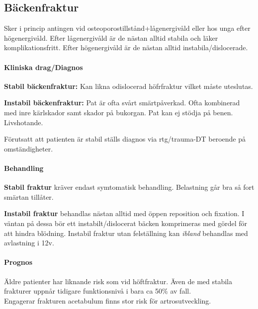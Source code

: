 \documentclass[
  letterpaper,
  DIV=11,
  numbers=noendperiod]{scrreport}
\let\oldparagraph\paragraph
\renewcommand{\paragraph}[1]{\oldparagraph{#1}\mbox{}}
\begin{document}
\hypertarget{buxe4ckenfraktur}{%
\subsection{Bäckenfraktur}\label{buxe4ckenfraktur}}

Sker i princip antingen vid osteoporostillstånd+lågenergivåld eller hos
unga efter högenergivåld. Efter lågenergivåld är de nästan alltid
stabila och läker komplikationsfritt. Efter högenergivåld är de nästan
alltid instabila/dislocerade.

\hypertarget{kliniska-dragdiagnos-9}{%
\paragraph{Kliniska drag/Diagnos}\label{kliniska-dragdiagnos-9}}

\textbf{Stabil bäckenfraktur:} Kan likna odislocerad höfrfraktur vilket
måste uteslutas.

\textbf{Instabil bäckenfraktur:} Pat är ofta svårt smärtpåverkad. Ofta
kombinerad med inre kärlskador samt skador på bukorgan. Pat kan ej
stödja på benen. Livshotande.

Förutsatt att patienten är stabil ställs diagnos via rtg/trauma-DT
beroende på omständigheter.

\hypertarget{behandling-10}{%
\paragraph{Behandling}\label{behandling-10}}

\textbf{Stabil fraktur} kräver endast symtomatisk behandling. Belastning
går bra så fort smärtan tillåter.

\textbf{Instabil fraktur} behandlas nästan alltid med öppen reposition
och fixation. I väntan på dessa bör ett instabilt/dislocerat bäcken
komprimeras med gördel för att hindra blödning. Instabil fraktur utan
felställning kan \emph{ibland} behandlas med avlastning i 12v.

\hypertarget{prognos-9}{%
\paragraph{Prognos}\label{prognos-9}}

Äldre patienter har liknande risk som vid höftfraktur. Även de med
stabila frakturer uppnår tidigare funktionsnivå i bara ca 50\% av
fall.\\
Engagerar frakturen acetabulum finns stor risk för artrosutveckling.
\end{document}
